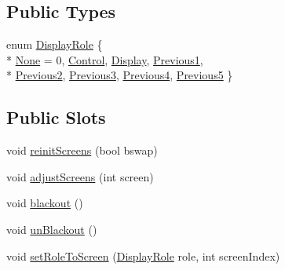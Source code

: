 \subsection*{Public Types}
\begin{DoxyCompactItemize}
\item 
enum \hyperlink{class_u_b_display_manager_a8ca88c477b630972d2d9fa7810162106}{Display\-Role} \{ \\*
\hyperlink{class_u_b_display_manager_a8ca88c477b630972d2d9fa7810162106a57e4587d958cafc8042532bdb6027acb}{None} =  0, 
\hyperlink{class_u_b_display_manager_a8ca88c477b630972d2d9fa7810162106a1edc3ec56f2181bd9580d4e40fddad93}{Control}, 
\hyperlink{class_u_b_display_manager_a8ca88c477b630972d2d9fa7810162106a71761afed29f078efd2e43feacffefed}{Display}, 
\hyperlink{class_u_b_display_manager_a8ca88c477b630972d2d9fa7810162106a58c2534100f07932c5d5abf7151b056c}{Previous1}, 
\\*
\hyperlink{class_u_b_display_manager_a8ca88c477b630972d2d9fa7810162106a4543d641767b589dc8a28ee2df17c8db}{Previous2}, 
\hyperlink{class_u_b_display_manager_a8ca88c477b630972d2d9fa7810162106a5f808d237a5d20bc903d1ad99ef78604}{Previous3}, 
\hyperlink{class_u_b_display_manager_a8ca88c477b630972d2d9fa7810162106a9a0d74ec9324537a11931218df566c7e}{Previous4}, 
\hyperlink{class_u_b_display_manager_a8ca88c477b630972d2d9fa7810162106a995b8a82495623dd9aeea1fd4891a831}{Previous5}
 \}
\end{DoxyCompactItemize}
\subsection*{Public Slots}
\begin{DoxyCompactItemize}
\item 
void \hyperlink{class_u_b_display_manager_a3983f3958bedc2c23555db769917c6cc}{reinit\-Screens} (bool bswap)
\item 
void \hyperlink{class_u_b_display_manager_a29552f5710e39a7e45c63627ead4d0e6}{adjust\-Screens} (int screen)
\item 
void \hyperlink{class_u_b_display_manager_ad63e13d90aee1a779ba82c72345fbad7}{blackout} ()
\item 
void \hyperlink{class_u_b_display_manager_a0d39dbe11146c6e9ebbe03f14bbebd2e}{un\-Blackout} ()
\item 
void \hyperlink{class_u_b_display_manager_a7f6ac20a2f57588751b0d30ba8834957}{set\-Role\-To\-Screen} (\hyperlink{class_u_b_display_manager_a8ca88c477b630972d2d9fa7810162106}{Display\-Role} role, int screen\-Index)
\end{DoxyCompactItemize}
